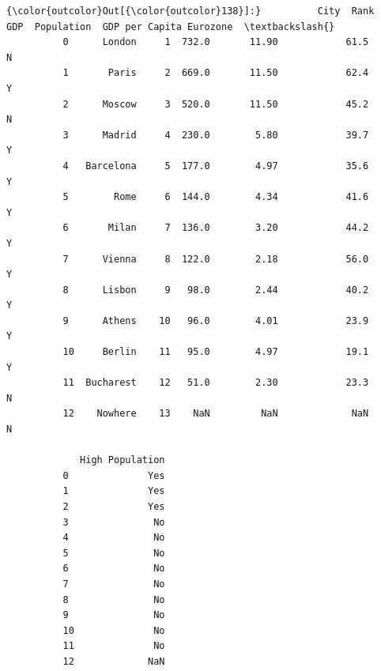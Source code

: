 \documentclass[11pt]{article}
\begin{document}
\begin{Verbatim}[commandchars=\\\{\}]
{\color{outcolor}Out[{\color{outcolor}138}]:}          City  Rank    GDP  Population  GDP per Capita Eurozone  \textbackslash{}
          0      London     1  732.0       11.90            61.5        N   
          1       Paris     2  669.0       11.50            62.4        Y   
          2      Moscow     3  520.0       11.50            45.2        N   
          3      Madrid     4  230.0        5.80            39.7        Y   
          4   Barcelona     5  177.0        4.97            35.6        Y   
          5        Rome     6  144.0        4.34            41.6        Y   
          6       Milan     7  136.0        3.20            44.2        Y   
          7      Vienna     8  122.0        2.18            56.0        Y   
          8      Lisbon     9   98.0        2.44            40.2        Y   
          9      Athens    10   96.0        4.01            23.9        Y   
          10     Berlin    11   95.0        4.97            19.1        Y   
          11  Bucharest    12   51.0        2.30            23.3        N   
          12    Nowhere    13    NaN         NaN             NaN        N   
          
             High Population  
          0              Yes  
          1              Yes  
          2              Yes  
          3               No  
          4               No  
          5               No  
          6               No  
          7               No  
          8               No  
          9               No  
          10              No  
          11              No  
          12             NaN  
\end{Verbatim}
            
\end{document}
